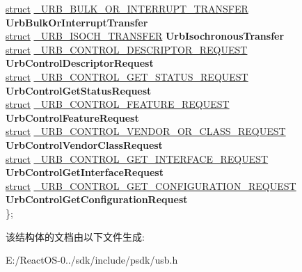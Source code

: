 \begin{DoxyCompactItemize}
\begin{tabbing}
\>\hyperlink{interfacestruct}{struct} \hyperlink{struct___u_r_b___b_u_l_k___o_r___i_n_t_e_r_r_u_p_t___t_r_a_n_s_f_e_r}{\_URB\_BULK\_OR\_INTERRUPT\_TRANSFER} {\bfseries UrbBulkOrInterruptTransfer}\\
\>\hyperlink{interfacestruct}{struct} \hyperlink{struct___u_r_b___i_s_o_c_h___t_r_a_n_s_f_e_r}{\_URB\_ISOCH\_TRANSFER} {\bfseries UrbIsochronousTransfer}\\
\>\hyperlink{interfacestruct}{struct} \hyperlink{struct___u_r_b___c_o_n_t_r_o_l___d_e_s_c_r_i_p_t_o_r___r_e_q_u_e_s_t}{\_URB\_CONTROL\_DESCRIPTOR\_REQUEST} {\bfseries UrbControlDescriptorRequest}\\
\>\hyperlink{interfacestruct}{struct} \hyperlink{struct___u_r_b___c_o_n_t_r_o_l___g_e_t___s_t_a_t_u_s___r_e_q_u_e_s_t}{\_URB\_CONTROL\_GET\_STATUS\_REQUEST} {\bfseries UrbControlGetStatusRequest}\\
\>\hyperlink{interfacestruct}{struct} \hyperlink{struct___u_r_b___c_o_n_t_r_o_l___f_e_a_t_u_r_e___r_e_q_u_e_s_t}{\_URB\_CONTROL\_FEATURE\_REQUEST} {\bfseries UrbControlFeatureRequest}\\
\>\hyperlink{interfacestruct}{struct} \hyperlink{struct___u_r_b___c_o_n_t_r_o_l___v_e_n_d_o_r___o_r___c_l_a_s_s___r_e_q_u_e_s_t}{\_URB\_CONTROL\_VENDOR\_OR\_CLASS\_REQUEST} {\bfseries UrbControlVendorClassRequest}\\
\>\hyperlink{interfacestruct}{struct} \hyperlink{struct___u_r_b___c_o_n_t_r_o_l___g_e_t___i_n_t_e_r_f_a_c_e___r_e_q_u_e_s_t}{\_URB\_CONTROL\_GET\_INTERFACE\_REQUEST} {\bfseries UrbControlGetInterfaceRequest}\\
\>\hyperlink{interfacestruct}{struct} \hyperlink{struct___u_r_b___c_o_n_t_r_o_l___g_e_t___c_o_n_f_i_g_u_r_a_t_i_o_n___r_e_q_u_e_s_t}{\_URB\_CONTROL\_GET\_CONFIGURATION\_REQUEST} {\bfseries UrbControlGetConfigurationRequest}\\
\}; \\

\end{tabbing}\end{DoxyCompactItemize}


该结构体的文档由以下文件生成\+:\begin{DoxyCompactItemize}
\item 
E\+:/\+React\+O\+S-\/0../sdk/include/psdk/usb.\+h\end{DoxyCompactItemize}
